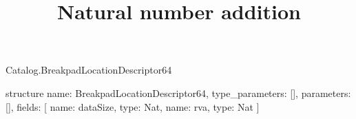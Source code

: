 \begin{lexlean}{Catalog.BreakpadLocationDescriptor64}
\title{Natural number addition}
\begin{semanticmodule}
structure{
  name: BreakpadLocationDescriptor64,
  type_parameters: [],
  parameters: [],
  fields: [
    {name: dataSize, type: Nat},
    {name: rva, type: Nat}
  ]
}
\end{semanticmodule}
\end{lexlean}
